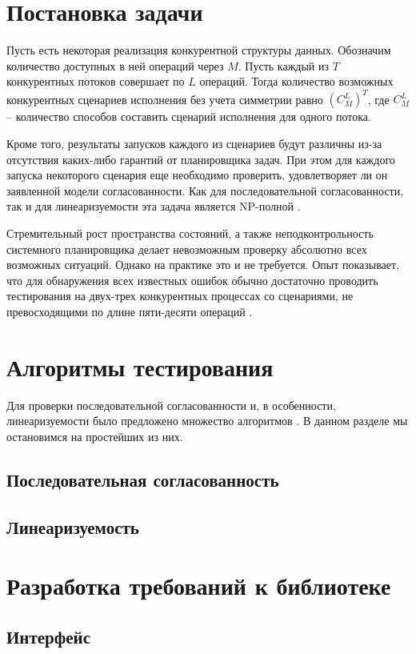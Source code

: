 \documentclass[14pt, openany]{book}
\begin{document}
\section{Постановка задачи}
Пусть есть некоторая реализация конкурентной структуры данных. Обозначим количество доступных в ней операций через \(M\). Пусть каждый из \(T\) конкурентных потоков совершает по \(L\) операций. Тогда количество возможных конкурентных сценариев исполнения без учета симметрии равно
\((C_M^L)^T\), где \(C_M^L\) -- количество способов составить сценарий исполнения для одного потока. \par
Кроме того, результаты запусков каждого из сценариев будут различны из-за отсутствия каких-либо гарантий от планировщика задач. При этом для каждого запуска некоторого сценария еще необходимо проверить, удовлетворяет ли он заявленной модели согласованности. Как для последовательной согласованности, так и для линеаризуемости эта задача является NP-полной \cite{complexity}. \par
Стремительный рост пространства состояний, а также неподконтрольность системного планировщика делает невозможным проверку абсолютно всех возможных ситуаций. Однако на практике это и не требуется. Опыт показывает, что для обнаружения всех известных ошибок обычно достаточно проводить тестирования на двух-трех конкурентных процессах со сценариями, не превосходящими по длине пяти-десяти операций \cite{lineup}.

\section{Алгоритмы тестирования}
Для проверки последовательной согласованности и, в особенности, линеаризуемости было предложено множество алгоритмов \cite{checkAlgorithms}. В данном разделе мы остановимся на простейших из них.
\subsection{Последовательная согласованность}

\subsection{Линеаризуемость}

\section{Разработка требований к библиотеке}

\subsection{Интерфейс}
\end{document}

